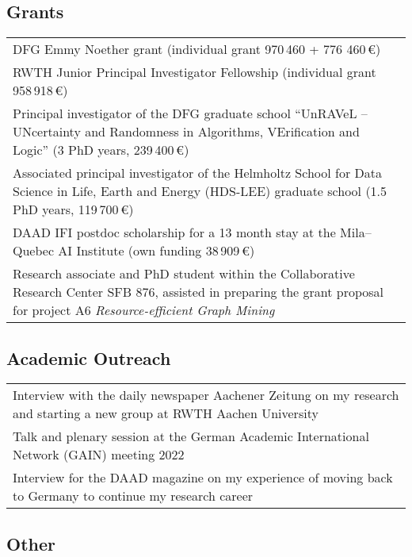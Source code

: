 \documentclass[11pt, a4paper, DIV=14, headings=small]{scrartcl}
\begin{document}
	\subsection*{Grants}
	\begin{tabular}{p{14.5cm}}
		DFG Emmy Noether grant (individual grant 970\,460 + 776 460\,€)                                                 \\[0.5em]
		
		RWTH Junior Principal Investigator Fellowship (individual grant 958\,918\,€)                                    \\[0.5em]
		
		Principal investigator of the DFG graduate school ``UnRAVeL -- UNcertainty and Randomness in Algorithms, VErification and Logic''  (3 PhD years, 239\,400\,€) \\[1.5em]
				
		Associated principal investigator of the Helmholtz School for Data Science in Life, Earth and Energy (HDS-LEE) graduate school (1.5 PhD years, 119\,700\,€) \\[1.5em]
		
		DAAD IFI postdoc scholarship for a 13 month stay at the Mila--Quebec AI Institute (own funding 38\,909\,€) \\[1.5em]
		
		Research associate and PhD student  within the Collaborative Research Center SFB 876, assisted in preparing the  grant proposal for project A6 \emph{Resource-efficient Graph Mining}\\
	\end{tabular}
	
	\subsection*{Academic Outreach}
	\begin{tabular}{p{14.5cm}}
		Interview with the daily newspaper Aachener Zeitung on my research and starting a new group at RWTH Aachen University \\[1.5em]	
	
		Talk and plenary session at the German Academic International Network (GAIN) meeting 2022 \\[1.5em]
		
		Interview for the DAAD magazine on my experience of moving back to Germany to continue my research career
	\end{tabular}
	
	\subsection*{Other}
	
\end{document}
